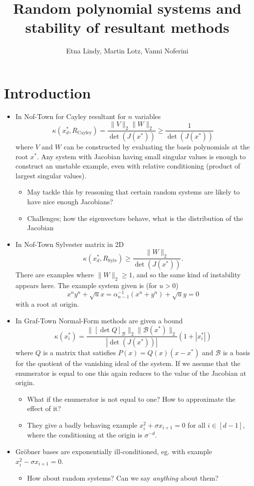 \documentclass[12pt]{article}
\title{Random polynomial systems and stability of resultant methods}
\author{Etna Lindy, Martin Lotz, Vanni Noferini}
\def\B{\mathcal{B}}
\def\kap{\kappa}
\def\cayleyM{R_{\mathrm{Cayley}}}
\def\sylvM{R_{\mathrm{Sylv}}}
\begin{document}
\maketitle

\section{Introduction}



\begin{itemize}
    \item In Nof-Town for Cayley resultant for $n$ variables
    \[ \kap (x^*_d, \cayleyM) = \frac{\|V\|_2 \|W\|_2}{\det(J(x^*))} \geq \frac{1}{\det(J(x^*))}  \]
    where $V$ and $W$ can be constructed by evaluating the basis polynomials at the root $x^*$. 
    Any system with Jacobian having small singular values is enough to construct an unstable example, even with relative conditioning (product of largest singular values).
    \begin{itemize}
        \item May tackle this by reasoning that certain random systems are likely to have nice enough Jacobians? 
        \item Challenges; how the eigenvectors behave, what is the distribution of the Jacobian
    \end{itemize}
    

    \item In Nof-Town Sylvester matrix in 2D
    \[ \kap (x_d^*, \sylvM) \geq \frac{\|W\|_2}{\det(J(x^*))}. \]
    There are examples where $\|W\|_2 \geq 1$, and so the same kind of instability appears here.
    The example system given is (for $u > 0$)
    \[ x^ny^n + \sqrt{u} x = \alpha_{n-1}^{-1}(x^n + y^n) + \sqrt{u} y = 0\]
    with a root at origin. 


    \item In Graf-Town Normal-Form methods are given a bound
    \[ \kap (x_i^*) = \frac{\|[\det Q]_\B \|_2 \|\B(x^*)\|_2 }{|\det(J(x^*))|}(1+|x_i^*|)\]
    where $Q$ is a matrix that satisfies $P(x) = Q(x) (x-x^*)$ and $\B$ is a basis for the quotient of the vanishing ideal of the system.
    If we assume that the enumerator is equal to one this again reduces to the value of the Jacobian at origin.
    \begin{itemize}
        \item What if the enumerator is not equal to one? How to approximate the effect of it?
        \item They give a badly behaving example $x_i^2 + \sigma x_{i+1} = 0$ for all $i \in [d-1]$, where the conditioning at the origin is $\sigma^{-d}$.
    \end{itemize}

    \item Gröbner bases are exponentially ill-conditioned, eg. with example $x_i^2 - \sigma x_{i+1} = 0$.
    \begin{itemize}
        \item How about random systems? Can we say {\it anything} about them?
    \end{itemize}
    
\end{itemize}
\end{document}
